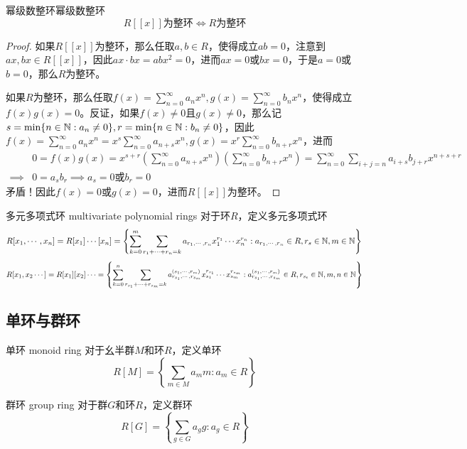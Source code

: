\begin{proposition}{幂级数整环}{幂级数整环}
	$$
	R[[x]]\text{为整环}\iff R\text{为整环}
	$$
\end{proposition}

\begin{proof}
	如果$R[[x]]$为整环，那么任取$a,b\in R$，使得成立$ab=0$，注意到$ax,bx\in R[[x]]$，因此$ax\cdot bx=abx^2=0$，进而$ax=0$或$bx=0$，于是$a=0$或$b=0$，那么$R$为整环。
	
	如果$R$为整环，那么任取$\displaystyle f(x)=\sum_{n=0}^{\infty}a_n x^n,g(x)=\sum_{n=0}^{\infty}b_n x^n$，使得成立$f(x)g(x)=0$。反证，如果$f(x)\ne 0$且$g(x)\ne 0$，那么记$s=\min\{ n\in \mathbb{N}:a_n\ne 0 \},r=\min\{ n\in \mathbb{N}:b_n\ne 0 \}$，因此$\displaystyle f(x)=\sum_{n=0}^{\infty}a_n x^n=x^s\sum_{n=0}^\infty a_{n+s} x^{n},g(x)=x^r\sum_{n=0}^{\infty}b_{n+r} x^n$，进而
	\begin{align*}
		&0=f(x)g(x)=x^{s+r}\left(\sum_{n=0}^\infty a_{n+s} x^{n}\right)\left(\sum_{n=0}^\infty b_{n+r} x^{n}\right)=\sum_{n=0}^{\infty}\sum_{i+j=n}a_{i+s}b_{j+r}x^{n+s+r}\\
		\implies& 0=a_sb_r\implies a_s=0\text{或}b_r=0
	\end{align*}
	矛盾！因此$f(x)=0$或$g(x)=0$，进而$R[[x]]$为整环。
\end{proof}

\begin{definition}{多元多项式环 multivariate polynomial rings}
	对于环$R$，定义多元多项式环
	$$
	R[x_1,\cdots,x_n]
	=R[x_1]\cdots[x_n]
	=\left\{ \sum_{k=0}^{m}\sum_{r_1+\cdots+r_n=k}a_{r_1,\cdots,r_n}x_1^{r_1}\cdots x_n^{r_n}:a_{r_1,\cdots,r_n}\in R,r_s\in \mathbb{N},m\in\mathbb{N} \right\}\\
	$$
	$$
	R[x_1,x_2\cdots]=R[x_1][x_2]\cdots=\left\{ \sum_{k=0}^{n}\sum_{r_{s_1}+\cdots+r_{s_m}=k}a^{(s_1,\cdots,r_m)}_{r_{s_1},\cdots,r_{s_m}}x_{s_1}^{r_{s_1}}\cdots x_{s_m}^{r_{s_m}}:a^{(s_1,\cdots,r_m)}_{r_{s_1},\cdots,r_{s_m}}\in R,r_{s_t}\in\mathbb{N},m,n\in\mathbb{N} \right\}
	$$
\end{definition}

\subsection{单环与群环}

\begin{definition}{单环 monoid ring}
	对于幺半群$M$和环$R$，定义单环
	$$
	R[M]=\left\{ \sum_{m\in M}a_mm:a_m\in R \right\}
	$$
\end{definition}

\begin{definition}{群环 group ring}
	对于群$G$和环$R$，定义群环
	$$
	R[G]=\left\{ \sum_{g\in G}a_gg:a_g\in R \right\}
	$$
\end{definition}

